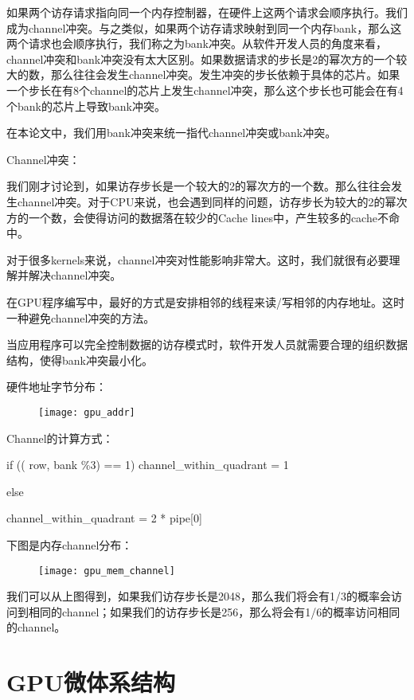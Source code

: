 如果两个访存请求指向同一个内存控制器，在硬件上这两个请求会顺序执行。我们成为channel冲突。与之类似，如果两个访存请求映射到同一个内存bank，那么这两个请求也会顺序执行，我们称之为bank冲突。从软件开发人员的角度来看，channel冲突和bank冲突没有太大区别。如果数据请求的步长是2的幂次方的一个较大的数，那么往往会发生channel冲突。发生冲突的步长依赖于具体的芯片。如果一个步长在有8个channel的芯片上发生channel冲突，那么这个步长也可能会在有4个bank的芯片上导致bank冲突。

在本论文中，我们用bank冲突来统一指代channel冲突或bank冲突。

Channel冲突：

我们刚才讨论到，如果访存步长是一个较大的2的幂次方的一个数。那么往往会发生channel冲突。对于CPU来说，也会遇到同样的问题，访存步长为较大的2的幂次方的一个数，会使得访问的数据落在较少的Cache lines中，产生较多的cache不命中。

对于很多kernels来说，channel冲突对性能影响非常大。这时，我们就很有必要理解并解决channel冲突。

在GPU程序编写中，最好的方式是安排相邻的线程来读/写相邻的内存地址。这时一种避免channel冲突的方法。

当应用程序可以完全控制数据的访存模式时，软件开发人员就需要合理的组织数据结构，使得bank冲突最小化。

硬件地址字节分布：

\begin{figure}[htbp]
	\centering
	\texttt{[image: gpu\_addr]}
	\label{fig:gpu_addr}
\end{figure}
Channel的计算方式：

if (({ row, bank} \%3) == 1)
channel\_within\_quadrant = 1

else

channel\_within\_quadrant = 2 * pipe[0]

下图是内存channel分布：
\begin{figure}[htbp]
	\centering
	\texttt{[image: gpu\_mem\_channel]}
	\label{fig:gpu_mem_channel}
\end{figure}

我们可以从上图得到，如果我们访存步长是2048，那么我们将会有1/3的概率会访问到相同的channel；如果我们的访存步长是256，那么将会有1/6的概率访问相同的channel。

\section{GPU微体系结构}

